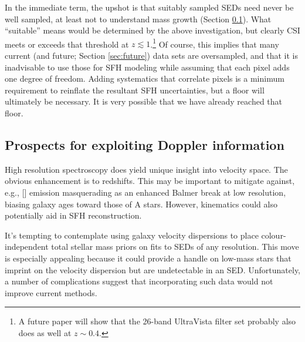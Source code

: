 \documentclass[a4paper,fleqn,usenatbib]{mnras}
\begin{document}
In the immediate term, the upshot is that suitably sampled SEDs need never be well sampled, at least
not to understand mass growth (Section \ref{sec:redshifts}). What ``suitable'' means would be determined 
by the above investigation, but clearly CSI meets or exceeds that threshold at $z\lesssim1$.\footnote{A future 
paper will show that the 26-band UltraVista filter set \citep{Muzzin13} probably also does as well at 
$z\sim0.4$.} Of course, this implies that many current (and future; Section \ref{sec:future}) data sets 
are oversampled, and that it is inadvisable to use those for SFH modeling while assuming that each 
pixel adds one degree of freedom. Adding systematics that correlate pixels is a minimum requirement 
to reinflate the resultant SFH uncertainties, but a floor will ultimately be necessary. It is very possible 
that we have already reached that floor.
\fi


\subsection{Prospects for exploiting Doppler information}
\label{sec:redshifts}

High resolution spectroscopy does yield unique insight into velocity space. The 
obvious enhancement is to redshifts. This may be important to mitigate against, e.g., []
emission masquerading as an enhanced Balmer break at low resolution, biasing galaxy ages 
toward those of A stars. However, kinematics could also potentially aid in SFH reconstruction.

It's tempting to contemplate using galaxy velocity dispersions 
to place colour-independent total stellar mass priors on fits to SEDs of any resolution. This
move is especially appealing because it could provide a handle on low-mass stars that imprint on 
the velocity dispersion but are undetectable in an SED. Unfortunately, a number of 
complications suggest that incorporating such data would not improve current methods.
\end{document}
